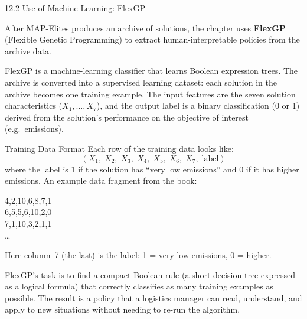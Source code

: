 \documentclass[aspectratio=169,10pt]{beamer}
\begin{document}
\begin{frame}[allowframebreaks]{12.2 Use of Machine Learning: FlexGP}

After MAP-Elites produces an archive of solutions, the chapter
uses \textbf{FlexGP} (Flexible Genetic Programming) to extract
human-interpretable policies from the archive data.

\medskip

FlexGP is a machine-learning classifier that learns Boolean expression trees.
The archive is converted into a supervised learning dataset:
each solution in the archive becomes one training example.
The input features are the seven solution characteristics ($X_1,\ldots,X_7$),
and the output label is a binary classification (0 or 1) derived from
the solution's performance on the objective of interest (e.g.\ emissions).

\medskip

\begin{block}{Training Data Format}
  Each row of the training data looks like:
  \[
    (X_1,\; X_2,\; X_3,\; X_4,\; X_5,\; X_6,\; X_7,\; \text{label})
  \]
  where the label is 1 if the solution has ``very low emissions''
  and 0 if it has higher emissions.
  An example data fragment from the book:
\begin{center}\ttfamily\scriptsize
  4,2,10,6,8,7,1 \\
  6,5,5,6,10,2,0 \\
  7,1,10,3,2,1,1 \\
  \ldots
\end{center}
  Here column~7 (the last) is the label: 1 = very low emissions, 0 = higher.
\end{block}

\medskip

FlexGP's task is to find a compact Boolean rule (a short decision tree
expressed as a logical formula) that correctly classifies as many
training examples as possible.
The result is a policy that a logistics manager can read, understand,
and apply to new situations without needing to re-run the algorithm.

\end{frame}
\end{document}
